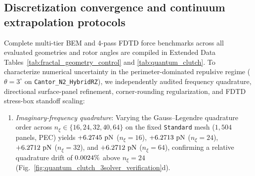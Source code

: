 \documentclass[pdflatex,sn-nature]{sn-jnl}
\DeclareRobustCommand{\roundfour}[1]{\fpeval{round(#1,4)}}
\begin{document}
\subsection*{Discretization convergence and continuum extrapolation protocols}
Complete multi-tier BEM and 4-pass FDTD force benchmarks across all evaluated geometries and rotor angles are compiled in Extended Data Tables~\ref{tab:fractal_geometry_control} and \ref{tab:quantum_clutch}. To characterize numerical uncertainty in the perimeter-dominated repulsive regime ($\theta=3^\circ$ on \texttt{Cantor\_N2\_HybridRZ}), we independently audited frequency quadrature, directional surface-panel refinement, corner-rounding regularization, and FDTD stress-box standoff scaling:
\begin{enumerate}
    \item \emph{Imaginary-frequency quadrature}: Varying the Gauss--Legendre quadrature order across $n_\xi \in \{16, 24, 32, 40, 64\}$ on the fixed \texttt{Standard} mesh ($1{,}504$ panels, PEC) yields $+\roundfour{\BemConvStdNxionesixPecFzPn}\text{ pN}$ ($n_\xi=16$), $+\roundfour{\BemConvStdNxitwofourPecFzPn}\text{ pN}$ ($n_\xi=24$), $+\roundfour{\BemConvStdNxithreetwoPecFzPn}\text{ pN}$ ($n_\xi=32$), and $+\roundfour{\BemConvStdNxisixfourPecFzPn}\text{ pN}$ ($n_\xi=64$), confirming a relative quadrature drift of $\roundfour{\BemConvNxiDriftPct}\%$ above $n_\xi = 24$ (Fig.~\ref{fig:quantum_clutch_3solver_verification}d).

\end{enumerate}
\end{document}
